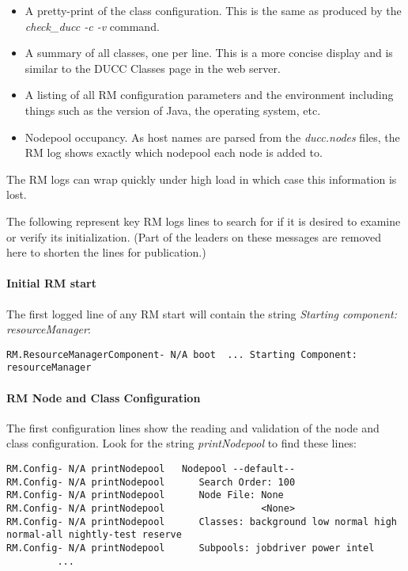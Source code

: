    \begin{itemize}
     \item A pretty-print of the class configuration.  This is the same as produced by the {\em check\_ducc -c -v} 
       command.
     \item A summary of all classes, one per line.  This is a more concise display and is similar to the
       DUCC Classes page in the web server.
     \item A listing of all RM configuration parameters and the environment including things such as the
       version of Java, the operating system, etc.
     \item Nodepool occupancy.  As host names are parsed from the {\em ducc.nodes} files, the RM log
       shows exactly which nodepool each node is added to.
   \end{itemize}
   
   The RM logs can wrap quickly under high load in which case this information is lost.

   The following represent key RM logs lines to search for if it is desired to examine or verify its
   initialization.  (Part of the leaders on these messages are removed here to shorten the
   lines for publication.)

    \paragraph{Initial RM start}
    The first logged line of any RM start will contain the string {\em Starting component:  resourceManager}:
\begin{verbatim}
RM.ResourceManagerComponent- N/A boot  ... Starting Component:  resourceManager
\end{verbatim}

    \paragraph{RM Node and Class Configuration}
    The first configuration lines show the reading and validation of the node and class configuration.  Look
    for the string {\em printNodepool} to find these lines:
\begin{verbatim}
RM.Config- N/A printNodepool   Nodepool --default--
RM.Config- N/A printNodepool      Search Order: 100
RM.Config- N/A printNodepool      Node File: None
RM.Config- N/A printNodepool                 <None>
RM.Config- N/A printNodepool      Classes: background low normal high normal-all nightly-test reserve
RM.Config- N/A printNodepool      Subpools: jobdriver power intel
         ...
\end{verbatim}

